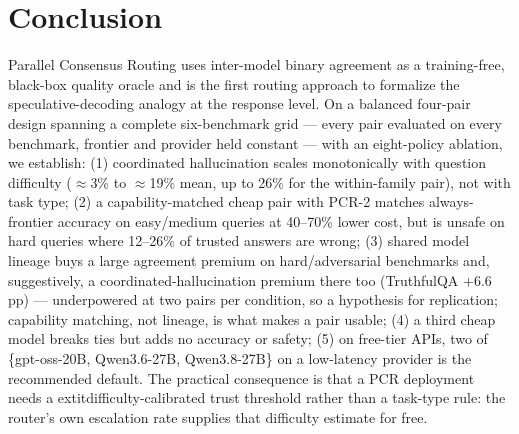 \documentclass[conference]{IEEEtran}
\begin{document}
\section{Conclusion}
Parallel Consensus Routing uses inter-model binary agreement as a training-free,
black-box quality oracle and is the first routing approach to formalize the
speculative-decoding analogy at the response level. On a balanced four-pair
design spanning a complete six-benchmark grid --- every pair evaluated on every
benchmark, frontier and provider held constant --- with an eight-policy
ablation, we establish:
(1) coordinated hallucination scales monotonically with question difficulty
($\approx$3\% to $\approx$19\% mean, up to 26\% for the within-family pair), not
with task type; (2) a capability-matched cheap pair
with PCR-2 matches always-frontier accuracy on easy/medium queries at 40--70\%
lower cost, but is unsafe on hard queries where 12--26\% of trusted answers are
wrong; (3) shared model lineage buys a large agreement premium on
hard/adversarial benchmarks and, suggestively, a coordinated-hallucination
premium there too (TruthfulQA $+6.6$\,pp) --- underpowered at two pairs per
condition, so a hypothesis for replication; capability matching, not lineage, is
what makes a pair usable; (4) a third cheap model breaks ties but adds no
accuracy or safety; (5) on free-tier APIs, two of \{gpt-oss-20B, Qwen3.6-27B,
Qwen3.8-27B\} on a low-latency provider is the recommended default.
The practical consequence is that a PCR deployment needs a
	extit{difficulty}-calibrated trust threshold rather than a task-type rule: the
router's own escalation rate supplies that difficulty estimate for free.
\end{document}
